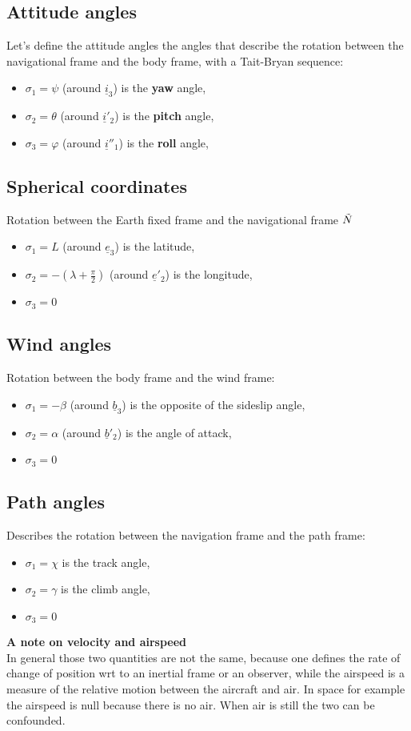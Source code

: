 \subsection{Attitude angles}
Let's define the attitude angles the angles that describe the rotation between the navigational frame and the body frame, with a Tait-Bryan sequence:
\begin{itemize}
    \item $\sigma_1 = \psi$ (around $\underline{i}_3$) is the \textbf{yaw} angle,
    \item $\sigma_2 = \theta$ (around $\underline{i}'_2$) is the \textbf{pitch} angle,
    \item $\sigma_3 = \varphi$ (around $\underline{i}''_1$) is the \textbf{roll} angle,
\end{itemize}

\subsection{Spherical coordinates}
Rotation between the Earth fixed frame and the navigational frame $\Tilde{N}$
\begin{itemize}
    \item $\sigma_1 = L$ (around $\underline{e}_3$) is the latitude,
    \item $\sigma_2 = -\left(\lambda + \frac{\pi}{2}\right)$ (around $\underline{e}'_2$) is the longitude,
    \item $\sigma_3 = 0$ 
\end{itemize}

\subsection{Wind angles}
Rotation between the body frame and the wind frame:
\begin{itemize}
    \item $\sigma_1 = -\beta$ (around $\underline{b}_3$) is the opposite of the sideslip angle,
    \item $\sigma_2 = \alpha$ (around $\underline{b}'_2$) is the angle of attack, 
    \item $\sigma_3 = 0$ 
\end{itemize}

\subsection{Path angles}
Describes the rotation between the navigation frame and the path frame:
\begin{itemize}
    \item $\sigma_1 = \chi$ is the track angle,
    \item $\sigma_2 = \gamma$ is the climb angle,
    \item $\sigma_3 = 0$
\end{itemize}
\textbf{A note on velocity and airspeed}\\
In general those two quantities are not the same, because one defines the rate of change of position wrt to an inertial frame or an observer, while the airspeed is a measure of the relative motion between the aircraft and air. In space for example the airspeed is null because there is no air. When air is still the two can be confounded.
